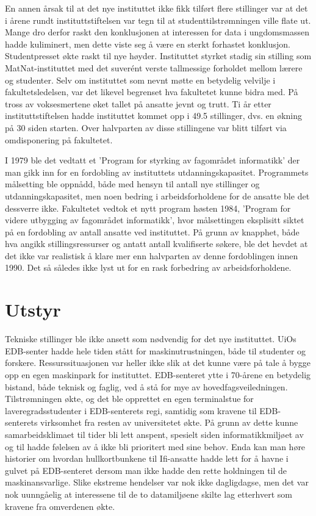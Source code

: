 En annen årsak til at det nye instituttet ikke fikk tilført flere stillinger var at det i årene rundt instituttstiftelsen var tegn til at studenttilstrømningen ville flate ut. Mange dro derfor raskt den konklusjonen at interessen for data i ungdomsmassen hadde kuliminert, men dette viste seg å være en sterkt forhastet konklusjon. Studentpresset økte raskt til nye høyder. Instituttet styrket stadig sin stilling som MatNat-instituttet med det suverént verste tallmessige forholdet mellom lærere og studenter. Selv om instituttet som nevnt møtte en betydelig velvilje i fakultetsledelsen, var det likevel begrenset hva fakultetet kunne bidra med. På tross av voksesmertene øket tallet på ansatte jevnt og trutt. Ti år etter instituttstiftelsen hadde instituttet kommet opp i 49.5 stillinger, dvs. en økning på 30 siden starten. Over halvparten av disse stillingene var blitt tilført via omdisponering på fakultetet.

I 1979 ble det vedtatt et 'Program for styrking av fagområdet informatikk' der man gikk inn for en fordobling av instituttets utdanningskapasitet. Programmets målsetting ble oppnådd, både med hensyn til antall nye stillinger og utdanningskapasitet, men noen bedring i arbeidsforholdene for de ansatte ble det dessverre ikke. Fakultetet vedtok et nytt program høsten 1984, 'Program for videre utbygging av fagområdet informatikk', hvor målsettingen eksplisitt siktet på en fordobling av antall ansatte ved instituttet. På grunn av knapphet, både hva angikk stillingsressurser og antatt antall kvalifiserte søkere, ble det hevdet at det ikke var realistisk å klare mer enn halvparten av denne fordoblingen innen 1990. Det så således ikke lyst ut for en rask forbedring av arbeidsforholdene.

\section{Utstyr}

Tekniske stillinger ble ikke ansett som nødvendig for det nye instituttet. UiOs EDB-senter hadde hele tiden stått for maskinutrustningen, både til studenter og forskere. Ressurssituasjonen var heller ikke slik at det kunne være på tale å bygge opp en egen maskinpark for instituttet. EDB-senteret ytte i 70-årene en betydelig bistand, både teknisk og faglig, ved å stå for mye av hovedfagsveiledningen. Tilstrømningen økte, og det ble opprettet en egen terminalstue for laveregradsstudenter i EDB-senterets regi, samtidig som kravene til EDB-senterets virksomhet fra resten av universitetet økte. På grunn av dette kunne samarbeidsklimaet til tider bli lett anspent, spesielt siden informatikkmiljøet av og til hadde følelsen av å ikke bli prioritert med sine behov. Enda kan man høre historier om hvordan hullkortbunkene til Ifi-ansatte hadde lett for å havne i gulvet på EDB-senteret dersom man ikke hadde den rette holdningen til de maskinansvarlige. Slike ekstreme hendelser var nok ikke dagligdagse, men det var nok uunngåelig at interessene til de to datamiljøene skilte lag etterhvert som kravene fra omverdenen økte.

